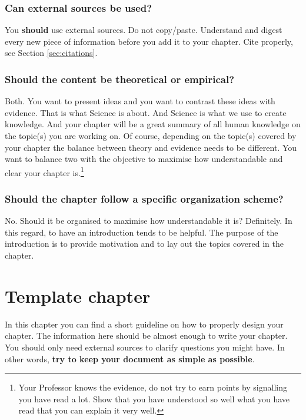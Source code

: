 \documentclass[11pt,a4paper,oneside]{book}
\begin{document}
\subsection*{Can external sources be used?}
You \textbf{should} use external sources. Do not copy/paste. Understand and digest every new piece of information before you add it to your chapter. Cite properly, see Section \ref{sec:citations}.

\subsection*{Should the content be theoretical or empirical?}
Both. You want to present ideas and you want to contrast these ideas with evidence. That is what Science is about. And Science is what we use to create knowledge. And your chapter will be a great summary of all human knowledge on the topic(s) you are working on. Of course, depending on the topic(s) covered by your chapter the balance between theory and evidence needs to be different. You want to balance two with the objective to maximise how understandable and clear your chapter is.\footnote{Your Professor knows the evidence, do not try to earn points by signalling you have read a lot. Show that you have understood so well what you have read that you can explain it very well.}

\subsection*{Should the chapter follow a specific organization scheme?}
No. Should it be organised to maximise how understandable it is? Definitely. In this regard, to have an introduction tends to be helpful. The purpose of the introduction is to provide motivation and to lay out the topics covered in the chapter.

\newpage
\tableofcontents
\listoffigures
\listoftables

\mainmatter

\chapter{Template chapter}
\label{ch:template_chapter}
In this chapter you can find a short guideline on how to properly design your chapter. The information here should be almost enough to write your chapter. You should only need external sources to clarify questions you might have. In other words, \textbf{try to keep your document as simple as possible}.
\end{document}

